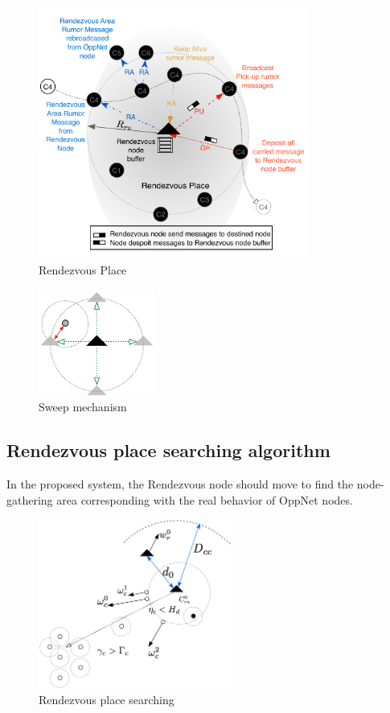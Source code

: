 \documentclass[conference]{IEEEtran}
\begin{document}
\begin{figure}[!t]
	\centering
	\includegraphics[width=3.5in]{Figures/NewRendezvousPlace.pdf}
	\caption{Rendezvous Place}
	\label{Rendezvous Place}
\end{figure}


\begin{figure}[!t]
\centering
\includegraphics[width=1.5in]{Figures/Sweep.pdf}
\caption{Sweep mechanism}
\label{Sweep mechanism}
\end{figure}

\subsection{Rendezvous place searching algorithm}

In the proposed system, the Rendezvous node should move to find the node-gathering area corresponding with the real behavior of OppNet nodes.
%
\begin{figure}[!t]
	\centering
	\includegraphics[width=2.5in]{Figures/Dynamic.pdf}
	\caption{Rendezvous place searching}
	\label{Rendezvous node movements}
\end{figure}
\end{document}
